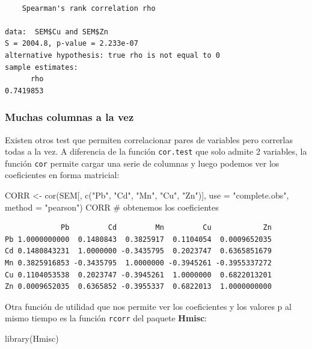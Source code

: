 \documentclass[
  letterpaper,
  DIV=11,
  numbers=noendperiod]{scrartcl}
\newenvironment{Shaded}{\begin{snugshade}}{\end{snugshade}}
\newcommand{\AttributeTok}[1]{\textcolor[rgb]{0.40,0.45,0.13}{#1}}
\newcommand{\CommentTok}[1]{\textcolor[rgb]{0.37,0.37,0.37}{#1}}
\newcommand{\FunctionTok}[1]{\textcolor[rgb]{0.28,0.35,0.67}{#1}}
\newcommand{\NormalTok}[1]{\textcolor[rgb]{0.00,0.23,0.31}{#1}}
\newcommand{\OtherTok}[1]{\textcolor[rgb]{0.00,0.23,0.31}{#1}}
\newcommand{\StringTok}[1]{\textcolor[rgb]{0.13,0.47,0.30}{#1}}
\begin{document}
\begin{verbatim}

    Spearman's rank correlation rho

data:  SEM$Cu and SEM$Zn
S = 2004.8, p-value = 2.233e-07
alternative hypothesis: true rho is not equal to 0
sample estimates:
      rho 
0.7419853 
\end{verbatim}

\hypertarget{muchas-columnas-a-la-vez}{%
\subsubsection{Muchas columnas a la
vez}\label{muchas-columnas-a-la-vez}}

Existen otros test que permiten correlacionar pares de variables pero
correrlas todas a la vez. A diferencia de la función \texttt{cor.test}
que solo admite 2 variables, la función \texttt{cor} permite cargar una
serie de columnas y luego podemos ver los coeficientes en forma
matricial:

\begin{Shaded}
\begin{Highlighting}[]
\NormalTok{CORR }\OtherTok{\textless{}{-}} \FunctionTok{cor}\NormalTok{(SEM[, }\FunctionTok{c}\NormalTok{(}\StringTok{"Pb"}\NormalTok{, }\StringTok{"Cd"}\NormalTok{, }\StringTok{"Mn"}\NormalTok{, }\StringTok{"Cu"}\NormalTok{, }\StringTok{"Zn"}\NormalTok{)],}
            \AttributeTok{use =} \StringTok{"complete.obs"}\NormalTok{, }\AttributeTok{method =} \StringTok{"pearson"}\NormalTok{)}
\NormalTok{CORR }\CommentTok{\# obtenemos los coeficientes}
\end{Highlighting}
\end{Shaded}

\begin{verbatim}
             Pb         Cd         Mn         Cu            Zn
Pb 1.0000000000  0.1480843  0.3825917  0.1104054  0.0009652035
Cd 0.1480843231  1.0000000 -0.3435795  0.2023747  0.6365851679
Mn 0.3825916853 -0.3435795  1.0000000 -0.3945261 -0.3955337272
Cu 0.1104053538  0.2023747 -0.3945261  1.0000000  0.6822013201
Zn 0.0009652035  0.6365852 -0.3955337  0.6822013  1.0000000000
\end{verbatim}

Otra función de utilidad que nos permite ver los coeficientes y los
valores p al mismo tiempo es la función \texttt{rcorr} del paquete
\textbf{Hmisc}:

\begin{Shaded}
\begin{Highlighting}[]
\FunctionTok{library}\NormalTok{(Hmisc)}
\end{Highlighting}
\end{Shaded}
\end{document}
